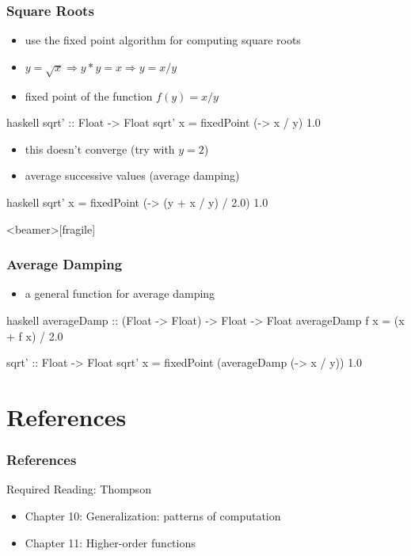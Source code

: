 \documentclass[dvipsnames]{beamer}
\theoremstyle{plain}
\begin{document}
\begin{frame}[fragile]
  \frametitle{Square Roots}

  \begin{itemize}
    \item use the fixed point algorithm for computing square roots
    \item $y = \sqrt{x} \Rightarrow y * y = x \Rightarrow y = x / y$
    \item fixed point of the function $f(y) = x / y$
  \end{itemize}

  \pause
  \begin{exampleblock}{}
    \begin{pygments}{haskell}
sqrt' :: Float -> Float
sqrt' x = fixedPoint (\y -> x / y) 1.0
    \end{pygments}
  \end{exampleblock}

  \pause
  \begin{itemize}
    \item this doesn't converge (try with $y = 2$)
    \item average successive values (average damping)
  \end{itemize}

  \begin{exampleblock}{}
    \begin{pygments}{haskell}
sqrt' x = fixedPoint (\y -> (y + x / y) / 2.0) 1.0
    \end{pygments}
  \end{exampleblock}
\end{frame}

\begin{frame}<beamer>[fragile]
  \frametitle{Average Damping}

  \begin{itemize}
    \item a general function for average damping
  \end{itemize}

  \begin{exampleblock}{}
    \begin{pygments}{haskell}
averageDamp :: (Float -> Float) -> Float -> Float
averageDamp f x = (x + f x) / 2.0

sqrt' :: Float -> Float
sqrt' x = fixedPoint (averageDamp (\y -> x / y)) 1.0
    \end{pygments}
  \end{exampleblock}
\end{frame}

\section*{References}

\begin{frame}
  \frametitle{References}

  \begin{block}{Required Reading: Thompson}
    \begin{itemize}
      \item Chapter 10: \alert{Generalization: patterns of computation}
      \item Chapter 11: \alert{Higher-order functions}
    \end{itemize}
  \end{block}
\end{frame}
\end{document}
